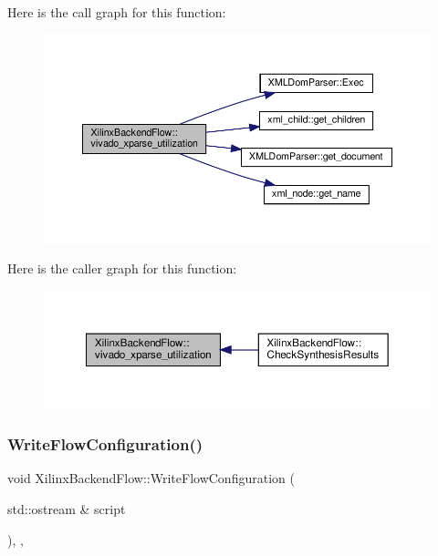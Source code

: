 Here is the call graph for this function\+:
\nopagebreak
\begin{figure}[H]
\begin{center}
\leavevmode
\includegraphics[width=350pt]{d6/d94/classXilinxBackendFlow_a4606bf711aee0e82892bb50e73eaa6e1_cgraph}
\end{center}
\end{figure}
Here is the caller graph for this function\+:
\nopagebreak
\begin{figure}[H]
\begin{center}
\leavevmode
\includegraphics[width=350pt]{d6/d94/classXilinxBackendFlow_a4606bf711aee0e82892bb50e73eaa6e1_icgraph}
\end{center}
\end{figure}
\mbox{\label{classXilinxBackendFlow_a0c32028a834101dcd6b6e6df5481dbe4}} 
\subsubsection{\texorpdfstring{Write\+Flow\+Configuration()}{WriteFlowConfiguration()}}
{\footnotesize\ttfamily void Xilinx\+Backend\+Flow\+::\+Write\+Flow\+Configuration (\begin{DoxyParamCaption}\item[{std\+::ostream \&}]{script }\end{DoxyParamCaption})\hspace{0.3cm}{\ttfamily [override]}, {\ttfamily [protected]}, {\ttfamily [virtual]}}



